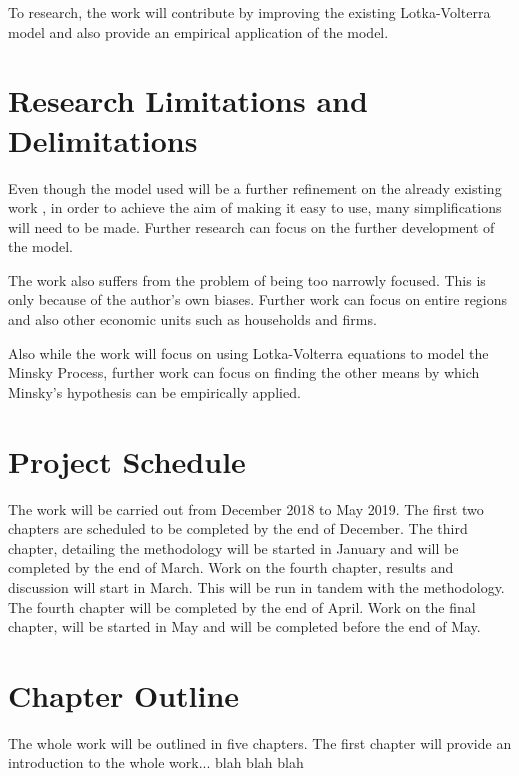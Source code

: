 \documentclass[a4paper]{article}
\begin{document}
	To research, the work will contribute by improving the existing Lotka-Volterra model and also provide an empirical application of the model.
	
	\section{Research Limitations and Delimitations}
	Even though the model used will be a further refinement on the already existing work \cite{vadasz2007economic,vercelli2009perspective,vercelli2010minsky}, in order to achieve the aim of making it easy to use, many simplifications will need to be made. Further research can focus on the further development of the model.
	
	The work also suffers from the problem of being too narrowly focused. This is only because of the author's own biases. Further work can focus on entire regions and also other economic units such as households and firms.
	
	Also while the work will focus on using Lotka-Volterra equations to model the Minsky Process, further work can focus on finding the other means by which Minsky's hypothesis can be empirically applied.
	\section{Project Schedule}
	The work will be carried out from December 2018 to May 2019. The first two chapters are scheduled to be completed by the end of December. The third chapter, detailing the methodology will be started in January and will be completed by the end of March. Work on the fourth chapter, results and discussion will start in March. This will be run in tandem with the methodology. The fourth chapter will be completed by the end of April. Work on the final chapter, will be started in May and will be completed before the end of May.
	
	

	\section{Chapter Outline}
	The whole work will be outlined in five chapters. The first chapter will provide an introduction to the whole work... blah blah blah
	
	\newpage
	\singlespacing
		
	
\end{document}
